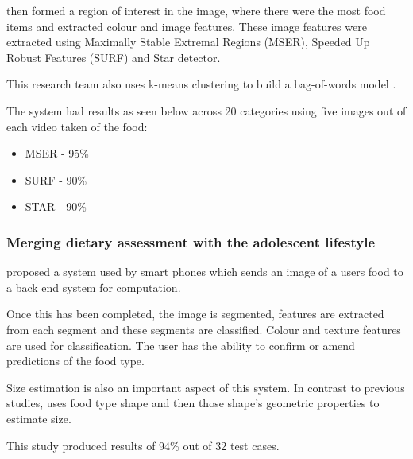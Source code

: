 \textcite{chen2010toward} then formed a region of interest in the image, where there were the most food items and extracted colour and image features.
These image features were extracted using Maximally Stable Extremal Regions (MSER), Speeded Up Robust Features (SURF) and Star detector.

This research team also uses k-means clustering to build a bag-of-words model \textcite{chen2010toward}.

The system had results as seen below across 20 categories using five images out of each video taken of the food:
\begin{itemize}
	\item{MSER - 95\%}
	\item{SURF - 90\%}
	\item{STAR - 90\%}
\end{itemize}




\subsubsection*{Merging dietary assessment with the adolescent lifestyle}
\textcite{schap2014merging} proposed a system used by smart phones which sends an image of a users food to a back end system for computation.

Once this has been completed, the image is segmented, features are extracted from each segment and these segments are classified.
Colour and texture features are used for classification.
The user has the ability to confirm or amend predictions of the food type.

Size estimation is also an important aspect of this system.
In contrast to previous studies, \textcite{snap} uses food type shape and then those shape's geometric properties to estimate size.

This study produced results of 94\% out of 32 test cases.
